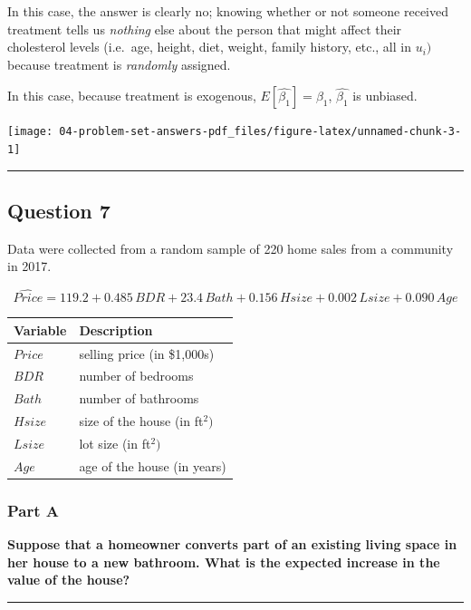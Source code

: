 \documentclass[
]{article}
\begin{document}
In this case, the answer is clearly no; knowing whether or not someone
received treatment tells us \emph{nothing} else about the person that
might affect their cholesterol levels (i.e.~age, height, diet, weight,
family history, etc., all in \(u_i)\) because treatment is
\emph{randomly} assigned.

In this case, because treatment is exogenous,
\(E[\hat{\beta_1}]=\beta_1\), \(\hat{\beta_1}\) is unbiased.

\texttt{[image: 04-problem-set-answers-pdf\_files/figure-latex/unnamed-chunk-3-1]}

\begin{center}\rule{0.5\linewidth}{0.5pt}\end{center}

\hypertarget{question-7}{%
\subsection{Question 7}\label{question-7}}

Data were collected from a random sample of 220 home sales from a
community in 2017.

\[\widehat{Price}=119.2+0.485 \, BDR+23.4 \, Bath+0.156 \, Hsize+0.002 \, Lsize+0.090 \, Age\]

\begin{longtable}[]{@{}ll@{}}
\toprule
Variable & Description \\
\midrule
\endhead
\(Price\) & selling price (in \$1,000s) \\
\(BDR\) & number of bedrooms \\
\(Bath\) & number of bathrooms \\
\(Hsize\) & size of the house (in ft\(^2)\) \\
\(Lsize\) & lot size (in ft\(^2)\) \\
\(Age\) & age of the house (in years) \\
\bottomrule
\end{longtable}

\hypertarget{part-a}{%
\subsubsection{Part A}\label{part-a}}

\textbf{Suppose that a homeowner converts part of an existing living
space in her house to a new bathroom. What is the expected increase in
the value of the house?}

\begin{center}\rule{0.5\linewidth}{0.5pt}\end{center}
\end{document}
